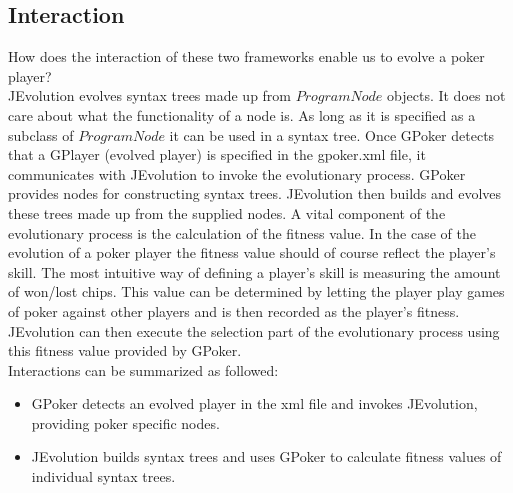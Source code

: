 \subsection{Interaction}
How does the interaction of these two frameworks enable us to evolve a poker player?  \\
JEvolution evolves syntax trees made up from $ProgramNode$ objects. It does not care about what the functionality of a node is. As long
as it is specified as a subclass of $ProgramNode$ it can be used in a syntax tree.
Once GPoker detects that a GPlayer (evolved player) is specified in the gpoker.xml file, it communicates with JEvolution to invoke the evolutionary process.  GPoker provides nodes 
for constructing syntax trees. JEvolution then builds and evolves these trees made up from the supplied nodes. A vital component of the evolutionary process is the calculation of the fitness value. In the case
of the evolution of a poker player the fitness value should of course reflect the player's skill. The most intuitive way of defining a player's skill is measuring the amount of won/lost chips.
This value can be determined by letting the player play games of poker against other players and is then recorded as the player's fitness. JEvolution can then execute the selection part
of the evolutionary process using this fitness value provided by GPoker.
\\
Interactions can be summarized as followed:
\begin{itemize}
	\item GPoker detects an evolved player in the xml file and invokes JEvolution, providing poker specific nodes.
	\item JEvolution builds syntax trees and uses GPoker to calculate fitness values of individual syntax trees.
\end{itemize}
